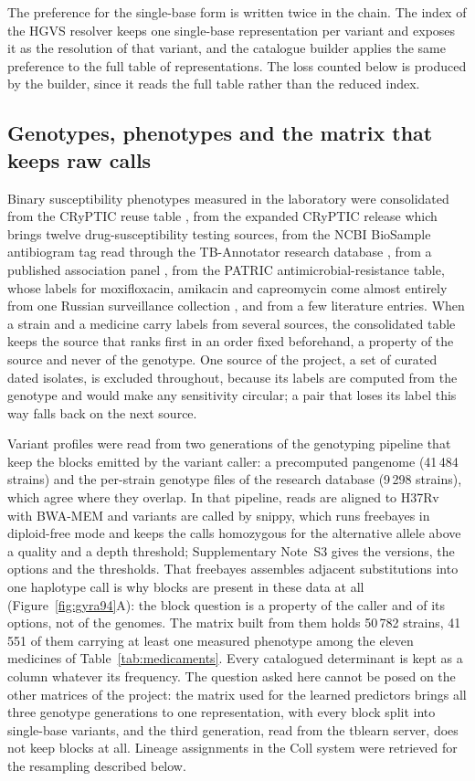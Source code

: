 \documentclass[11pt]{article}
\begin{document}
The preference for the single-base form is written twice in the chain. The index of the
HGVS resolver keeps one single-base representation per variant and exposes it as the
resolution of that variant, and the catalogue builder applies the same preference to the
full table of representations. The loss counted below is produced by the builder, since it
reads the full table rather than the reduced index.

\subsection{Genotypes, phenotypes and the matrix that keeps raw calls}
Binary susceptibility phenotypes measured in the laboratory were consolidated from the
CRyPTIC reuse table \cite{cryptic2022}, from the expanded CRyPTIC release
\cite{cryptic2026dataset} which brings twelve drug-susceptibility testing sources, from the
NCBI BioSample antibiogram tag read through the TB-Annotator research database
\cite{senelle2023}, from a published association panel \cite{coll2018}, from the PATRIC
antimicrobial-resistance table, whose labels for moxifloxacin, amikacin and capreomycin
come almost entirely from one Russian surveillance collection \cite{casali2014}, and from
a few literature entries. When a strain and a
medicine carry labels from several sources, the consolidated table keeps the source that
ranks first in an order fixed beforehand, a property of the source and never of the
genotype. One source of the project, a set of curated dated isolates, is excluded
throughout, because its labels are computed from the genotype and would make any
sensitivity circular; a pair that loses its label this way falls back on the next source.

Variant profiles were read from two generations of the genotyping pipeline that keep the
blocks emitted by the variant caller: a precomputed pangenome (41\,484 strains) and the
per-strain genotype files of the research database \cite{senelle2023} (9\,298 strains), which
agree where they overlap. In that pipeline, reads are aligned to H37Rv with BWA-MEM and
variants are called by snippy, which runs freebayes in diploid-free mode and keeps the calls
homozygous for the alternative allele above a quality and a depth threshold; Supplementary
Note~S3 gives the versions, the options and the thresholds. That freebayes assembles adjacent
substitutions into one haplotype call is why blocks are present in these data at all
(Figure~\ref{fig:gyra94}A): the
block question is a property of the caller and of its options, not of the genomes. The matrix built from them holds 50\,782 strains, 41\,551 of
them carrying at least one measured phenotype among the eleven medicines of
Table~\ref{tab:medicaments}. Every catalogued determinant is kept as a column whatever its
frequency. The question asked here cannot be posed on the other matrices of the project:
the matrix used for the learned predictors brings all three genotype generations to one
representation, with every block split into single-base variants, and the third generation,
read from the tblearn server, does not keep blocks at all. Lineage
assignments in the Coll system were retrieved for the resampling described below.
\end{document}
